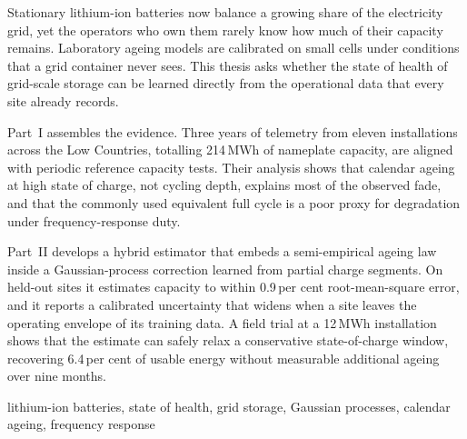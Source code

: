 
Stationary lithium-ion batteries now balance a growing share of the
electricity grid, yet the operators who own them rarely know how much
of their capacity remains. Laboratory ageing models are calibrated on
small cells under conditions that a grid container never sees. This thesis asks whether the state of health of grid-scale storage
can be learned directly from the operational data that every site already
records.

Part~I assembles the evidence. Three years of telemetry from eleven
installations across the Low Countries, totalling 214\,MWh of nameplate
capacity, are aligned with periodic reference capacity tests. Their
analysis shows that calendar ageing at high state of charge, not cycling
depth, explains most of the observed fade, and that the commonly used
equivalent full cycle is a poor proxy for degradation under
frequency-response duty.

Part~II develops a hybrid estimator that embeds a semi-empirical ageing
law inside a Gaussian-process correction learned from partial charge
segments. On held-out sites it estimates capacity to within 0.9\,per cent
root-mean-square error, and it reports a calibrated uncertainty that widens when a site
leaves the operating envelope of its training data. A field trial at a
12\,MWh installation shows that the estimate can safely relax a
conservative state-of-charge window, recovering 6.4\,per cent of usable
energy without measurable additional ageing over nine months.

\bigskip\noindent
{\sansbold\small\color{accent}}\enspace
{\sffamily\small lithium-ion batteries, state of health, grid storage,
Gaussian processes, calendar ageing, frequency response}
